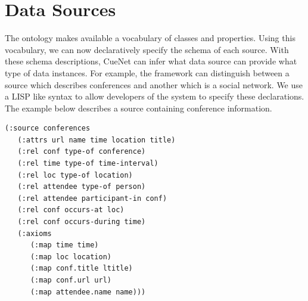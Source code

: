 \section{Data Sources}
\label{sec:data-sources}
The ontology makes available a vocabulary of classes and properties. Using this vocabulary, we can now declaratively specify the schema of each source. With these schema descriptions, CueNet can infer what data source can provide what type of data instances. For example, the framework can distinguish between a source which describes conferences and another which is a social network. We use a LISP like syntax to allow developers of the system to specify these declarations. The example below describes a source containing conference information.

\begin{verbatim}
(:source conferences
   (:attrs url name time location title)
   (:rel conf type-of conference)
   (:rel time type-of time-interval)
   (:rel loc type-of location)
   (:rel attendee type-of person)
   (:rel attendee participant-in conf)
   (:rel conf occurs-at loc)
   (:rel conf occurs-during time)
   (:axioms
      (:map time time)
      (:map loc location)
      (:map conf.title ltitle)
      (:map conf.url url)
      (:map attendee.name name)))
\end{verbatim}


